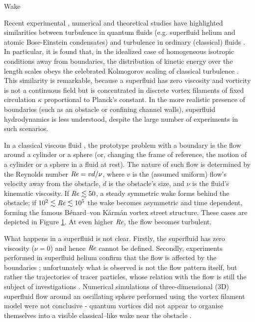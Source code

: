 \begin{chapter}{\label{cha:wake}Wake}
\begin{figure}[h]
  \label{fig:taneda-imgs}
\end{figure}
Recent experimental \cite{Tabeling,Salort}, 
numerical \cite{Nore,Kobayashi,Laurie} 
and theoretical studies \cite{Lvov}
have highlighted similarities between turbulence in quantum
fluids (e.g. superfluid helium and atomic Bose-Einstein condensates)
and turbulence in ordinary (classical) fluids \cite{Frisch}.
In particular, it is found that, in
the idealized case of homogeneous isotropic conditions away from
boundaries, the distribution of kinetic energy over the 
length scales obeys the celebrated Kolmogorov scaling of 
classical turbulence \cite{barenghi}. This similarity is remarkable,
because a superfluid has zero viscosity and vorticity is not a continuous
field but is concentrated in discrete vortex filaments of fixed 
circulation $\kappa$ proportional to Planck's constant. 
In the more realistic
presence of boundaries (such as an obstacle or confining channel
walls), superfluid hydrodynamics
is less understood, despite the large number of experiments in such scenarios. 

In a classical viscous fluid \cite{Frisch}, the prototype problem with
a boundary is the flow 
around a cylinder or a sphere (or, changing the frame of reference, 
the motion of a cylinder or a sphere in a fluid at rest).
The nature of such flow is determined by the Reynolds 
number $\mbox{\ensuremath{\mathit{Re}}} = vd/\nu$, where $v$ is the (assumed uniform)
flow's velocity away from the obstacle, $d$ is the obstacle's size,
and $\nu$ is the fluid's
kinematic viscosity. If $\mbox{\ensuremath{\mathit{Re}}}\lesssim50$, a steady symmetric 
wake forms behind the obstacle; if $10^2\lesssim\mbox{\ensuremath{\mathit{Re}}}\lesssim10^5$ the wake 
becomes asymmetric and time dependent, forming the famous 
B\'enard--von K\'arm\'an vortex street structure.  These cases are depicted in Figure \ref{fig:taneda-imgs}.  At even higher $\mbox{\ensuremath{\mathit{Re}}}$,
the flow becomes turbulent. 

What happens in a superfluid is not clear. Firstly, the superfluid has
zero viscosity ($\nu=0$) and hence $\mbox{\ensuremath{\mathit{Re}}}$ cannot be defined. Secondly,
experiments performed in superfluid helium confirm that the flow is affected
by the boundaries \cite{VanSciver1999,VanSciver2005}; unfortunately 
what is observed is not the flow pattern itself, but rather the
trajectories of tracer particles, whose
relation with the flow is still the subject
of investigations \cite{sergeev09}. Numerical simulations of three-dimensional (3D) superfluid flow around
an oscillating sphere performed using the vortex filament model
were not conclusive - 
quantum vortices did not appear to organise themselves
into a visible classical--like wake near the obstacle \cite{Hanninen,Fujiyama,goto08}.


\end{chapter}
